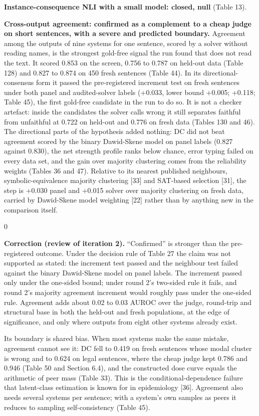 \documentclass[11pt,letterpaper]{article}
\newenvironment{correction}{\par\medskip\noindent\begin{minipage}{\linewidth}\setlength{\fboxsep}{6pt}\begin{lrbox}{0}\begin{minipage}{0.96\linewidth}\small}{\end{minipage}\end{lrbox}\colorbox{black!6}{\usebox{0}}\end{minipage}\par\medskip}
\begin{document}
\textbf{Instance-consequence NLI with a small model: closed, null} (Table 13).

\textbf{Cross-output agreement: confirmed as a complement to a cheap judge on short sentences, with a severe and predicted boundary.} Agreement among the outputs of nine systems for one sentence, scored by a solver without reading names, is the strongest gold-free signal the run found that does not read the text. It scored 0.853 on the screen, 0.756 to 0.787 on held-out data (Table 128) and 0.827 to 0.874 on 450 fresh sentences (Table 44). In its directional-consensus form it passed the pre-registered increment test on fresh sentences under both panel and audited-solver labels (+0.033, lower bound +0.005; +0.118; Table 45), the first gold-free candidate in the run to do so. It is not a checker artefact: inside the candidates the solver calls wrong it still separates faithful from unfaithful at 0.722 on held-out and 0.776 on fresh data (Tables 130 and 46). The directional parts of the hypothesis added nothing: DC did not beat agreement scored by the binary Dawid-Skene model on panel labels (0.827 against 0.830), the net strength profile ranks below chance, error typing failed on every data set, and the gain over majority clustering comes from the reliability weights (Tables 36 and 47). Relative to its nearest published neighbours, symbolic-equivalence majority clustering [33] and SAT-based selection [31], the step is +0.030 panel and +0.015 solver over majority clustering on fresh data, carried by Dawid-Skene model weighting [22] rather than by anything new in the comparison itself.

\begin{correction}\textbf{Correction (review of iteration 2).} ``Confirmed'' is stronger than the pre-registered outcome. Under the decision rule of Table 27 the claim was not supported as stated: the increment test passed and the neighbour test failed against the binary Dawid-Skene model on panel labels. The increment passed only under the one-sided bound; under round 2's two-sided rule it fails, and round 2's majority agreement increment would roughly pass under the one-sided rule. Agreement adds about 0.02 to 0.03 AUROC over the judge, round-trip and structural base in both the held-out and fresh populations, at the edge of significance, and only where outputs from eight other systems already exist.\end{correction}

Its boundary is shared bias. When most systems make the same mistake, agreement cannot see it: DC fell to 0.419 on fresh sentences whose modal cluster is wrong and to 0.624 on legal sentences, where the cheap judge kept 0.786 and 0.946 (Table 50 and Section 6.4), and the constructed dose curve equals the arithmetic of peer mass (Table 33). This is the conditional-dependence failure that latent-class estimation is known for in epidemiology [36]. Agreement also needs several systems per sentence; with a system's own samples as peers it reduces to sampling self-consistency (Table 45).
\end{document}
